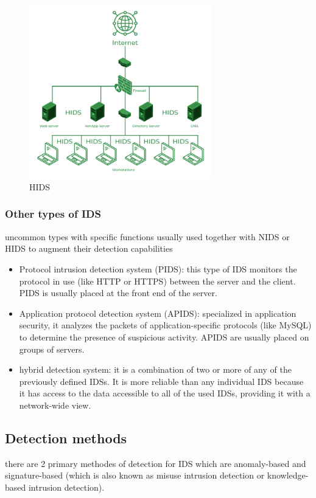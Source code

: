 \begin{figure}[h]
	\centering
	\includegraphics[width=300px]{figures/HIDS.png}
	\caption{HIDS \cite{geeksforgeeks}}
	\label{fig:HIDS}
\end{figure}



\subsubsection{Other types of IDS}
uncommon types with specific functions usually used together with NIDS or HIDS to augment their detection capabilities

\firmlist
\begin{itemize}
	\item Protocol intrusion detection system (PIDS): this type of IDS monitors the protocol in use (like HTTP or HTTPS) between the server and the client. PIDS is usually placed at the front end of the server. \cite{geeksforgeeks}


	\item Application protocol detection system (APIDS): specialized in application security, it analyzes the packets of application-specific protocols (like MySQL) to determine the presence of suspicious activity. APIDS are usually placed on groups of servers. \cite{geeksforgeeks}
	

	\item hybrid detection system: it is a combination of two or more of any of the previously defined IDSs. It is more reliable than any individual IDS because it has access to the data accessible to all of the used IDSs, providing it with a network-wide view.
	\cite{geeksforgeeks}
\end{itemize}




\subsection{Detection methods}
there are 2 primary methodes of detection for IDS which are anomaly-based and signature-based (which is also known as misuse intrusion detection or knowledge-based intrusion detection). \cite{ids-classification}



